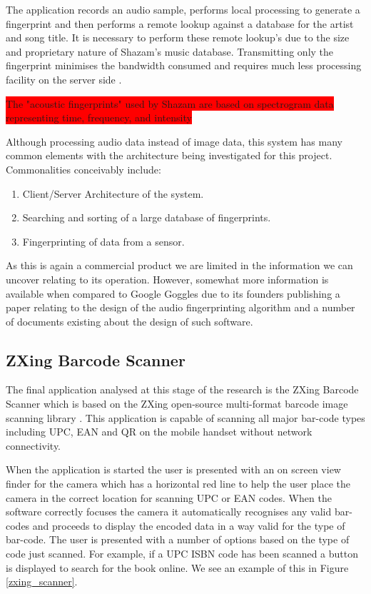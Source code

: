 The application records an audio sample, performs local processing to generate a fingerprint and then performs a remote lookup against a database for the artist and song title. It is necessary to perform these remote lookup’s due to the size and proprietary nature of Shazam’s music database. Transmitting only the fingerprint minimises the bandwidth consumed and requires much less processing facility on the server side \cite{wang03}.

\colorbox{red}{The "acoustic fingerprints" used by Shazam are based on spectrogram data representing time, frequency, and intensity}

Although processing audio data instead of image data, this system has many common elements with the architecture being investigated for this project. Commonalities conceivably include:

\begin{enumerate}
\item Client/Server Architecture of the system.
\item Searching and sorting of a large database of fingerprints.
\item Fingerprinting of data from a sensor.
\end{enumerate}

As this is again a commercial product we are limited in the information we can uncover relating to its operation. However, somewhat more information is available when compared to Google Goggles due to its founders publishing a paper relating to the design of the audio fingerprinting algorithm and a number of documents existing about the design of such software.

\subsection{ZXing Barcode Scanner}
The final application analysed at this stage of the research is the ZXing Barcode Scanner which is based on the ZXing open-source multi-format barcode image scanning library \cite{zxingproject}. This application is capable of scanning all major bar-code types including UPC, EAN and QR on the mobile handset without network connectivity.

When the application is started the user is presented with an on screen view finder for the camera which has a horizontal red line to help the user place the camera in the correct location for scanning UPC or EAN codes. When the software correctly focuses the camera it automatically recognises any valid bar-codes and proceeds to display the encoded data in a way valid for the type of bar-code. The user is presented with a number of options based on the type of code just scanned. For example, if a UPC ISBN code has been scanned a button is displayed to search for the book online. We see an example of this in Figure \ref{zxing_scanner}.

